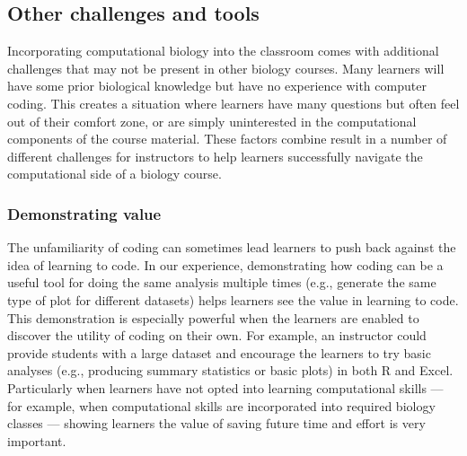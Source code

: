 

\subsection{Other challenges and tools}

Incorporating computational biology into the classroom comes with additional challenges that may not be present in other biology courses.
Many learners will have some prior biological knowledge but have no experience with computer coding.
This creates a situation where learners have many questions but often feel out of their comfort zone, or are simply uninterested in the computational components of the course material.
These factors combine result in a number of different challenges for instructors to help learners successfully navigate the computational side of a biology course.

\subsubsection{Demonstrating value}
The unfamiliarity of coding can sometimes lead learners to push back against the idea of learning to code.
In our experience, demonstrating how coding can be a useful tool for doing the same analysis multiple times (e.g., generate the same type of plot for different datasets) helps learners see the value in learning to code. 
This demonstration is especially powerful when the learners are enabled to discover the utility of coding on their own. 
For example, an instructor could provide students with a large dataset and encourage the learners to try basic analyses (e.g., producing summary statistics or basic plots) in both R and Excel. 
Particularly when learners have not opted into learning computational skills --- for example, when computational skills are incorporated into required biology classes --- showing learners the value of saving future time and effort is very important. 


